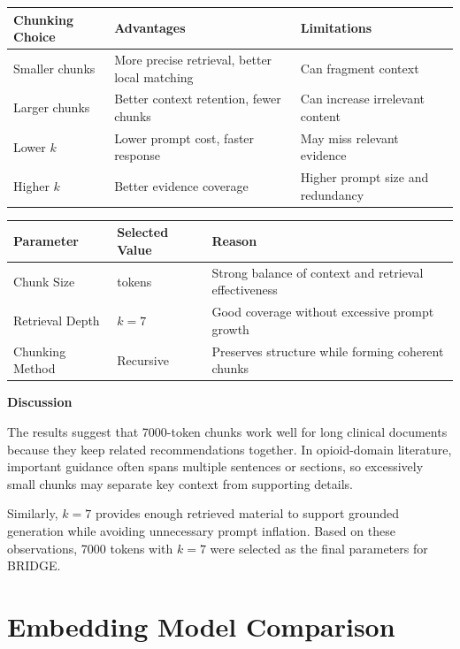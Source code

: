 \documentclass[12pt]{article}
\begin{document}
\begin{center}
\begin{tabular}{>{\raggedright\arraybackslash}p{1.7in} >{\raggedright\arraybackslash}p{2.2in} >{\raggedright\arraybackslash}p{2.2in}}
\toprule
\textbf{Chunking Choice} & \textbf{Advantages} & \textbf{Limitations} \\
\midrule
Smaller chunks & More precise retrieval, better local matching & Can fragment context \\
Larger chunks & Better context retention, fewer chunks & Can increase irrelevant content \\
Lower $k$ & Lower prompt cost, faster response & May miss relevant evidence \\
Higher $k$ & Better evidence coverage & Higher prompt size and redundancy \\
\bottomrule
\end{tabular}
\end{center}

\begin{center}
\begin{tabular}{>{\raggedright\arraybackslash}p{1.5in} >{\raggedright\arraybackslash}p{1.5in} >{\raggedright\arraybackslash}p{3.0in}}
\toprule
\textbf{Parameter} & \textbf{Selected Value} & \textbf{Reason} \\
\midrule
Chunk Size & 7000 tokens & Strong balance of context and retrieval effectiveness \\
Retrieval Depth & $k = 7$ & Good coverage without excessive prompt growth \\
Chunking Method & Recursive & Preserves structure while forming coherent chunks \\
\bottomrule
\end{tabular}
\end{center}

\textbf{Discussion}

The results suggest that 7000-token chunks work well for long clinical documents because they keep related recommendations together. In opioid-domain literature, important guidance often spans multiple sentences or sections, so excessively small chunks may separate key context from supporting details.

Similarly, $k = 7$ provides enough retrieved material to support grounded generation while avoiding unnecessary prompt inflation. Based on these observations, 7000 tokens with $k = 7$ were selected as the final parameters for BRIDGE.

\section{Embedding Model Comparison}
\end{document}
